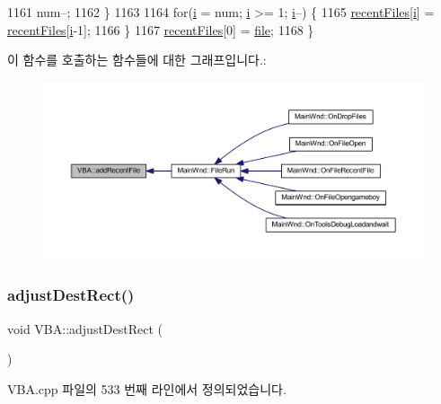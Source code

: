 \begin{DoxyCode}
1161     num--;
1162   \}
1163 
1164   \textcolor{keywordflow}{for}(\mbox{\hyperlink{expr-lex_8cpp_acb559820d9ca11295b4500f179ef6392}{i}} = num; \mbox{\hyperlink{expr-lex_8cpp_acb559820d9ca11295b4500f179ef6392}{i}} >= 1; \mbox{\hyperlink{expr-lex_8cpp_acb559820d9ca11295b4500f179ef6392}{i}}--) \{
1165     \mbox{\hyperlink{class_v_b_a_ab5efdeee24caf6cec163a3f51b50bf64}{recentFiles}}[\mbox{\hyperlink{expr-lex_8cpp_acb559820d9ca11295b4500f179ef6392}{i}}] = \mbox{\hyperlink{class_v_b_a_ab5efdeee24caf6cec163a3f51b50bf64}{recentFiles}}[\mbox{\hyperlink{expr-lex_8cpp_acb559820d9ca11295b4500f179ef6392}{i}}-1];
1166   \}
1167   \mbox{\hyperlink{class_v_b_a_ab5efdeee24caf6cec163a3f51b50bf64}{recentFiles}}[0] = \mbox{\hyperlink{expr-lex_8cpp_a702945180aa732857b380a007a7e2a21}{file}};
1168 \}
\end{DoxyCode}
이 함수를 호출하는 함수들에 대한 그래프입니다.\+:
\nopagebreak
\begin{figure}[H]
\begin{center}
\leavevmode
\includegraphics[width=350pt]{class_v_b_a_a6b68e58bd0ae7a246ca3c1cd66a1c9db_icgraph}
\end{center}
\end{figure}
\mbox{\label{class_v_b_a_acb822065cba8b15810c5a61fd05ca831}} 
\subsubsection{\texorpdfstring{adjust\+Dest\+Rect()}{adjustDestRect()}}
{\footnotesize\ttfamily void V\+B\+A\+::adjust\+Dest\+Rect (\begin{DoxyParamCaption}{ }\end{DoxyParamCaption})}



V\+B\+A.\+cpp 파일의 533 번째 라인에서 정의되었습니다.


